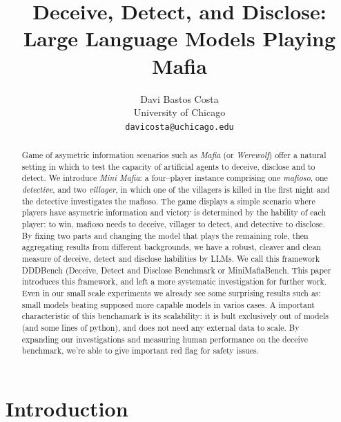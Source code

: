 \documentclass{article}
\title{Deceive, Detect, and Disclose: \\ Large Language Models Playing Mafia}
\author{%
  Davi Bastos Costa \\
  University of Chicago \\
  \texttt{davicosta@uchicago.edu} \\
}
\begin{document}
\maketitle

\begin{abstract}
Game of asymetric information scenarios such as \emph{Mafia} (or \emph{Werewolf}) offer a natural setting in which to test the capacity of artificial agents to deceive, disclose and to detect.  We introduce \textit{Mini Mafia}: a four--player instance comprising one \emph{mafioso}, one \emph{detective}, and two \emph{villager}, in which one of the villagers is killed in the first night and the detective investigates the mafioso. The game displays a simple scenario where players have asymetric information and victory is determined by the hability of each player: to win, mafioso needs to deceive, villager to detect, and detective to disclose. By fixing two parts and changing the model that plays the remaining role, then aggregating results from different backgrounds, we have a robust, cleaver and clean measure of deceive, detect and disclose habilities by LLMs. We call this framework DDDBench (Deceive, Detect and Disclose Benchmark or MiniMafiaBench. This paper introduces this framework, and left a more systematic investigation for further work. Even in our small scale experiments we already see some surprising results such as: small models beating supposed more capable models in varios cases. A important characteristic of this benchamark is its scalability: it is bult exclusively out of models (and some lines of python), and does not need any external data to scale. By expanding our investigations and measuring human performance on the deceive benchmark, we're able to give important red flag for safety issues.
\end{abstract}

\tableofcontents

\section{Introduction}
\end{document}
